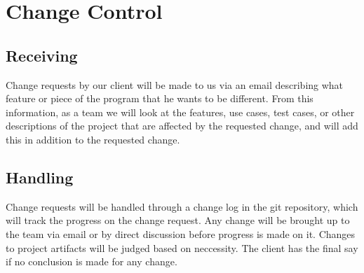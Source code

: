 \section{Change Control}
\subsection{Receiving}
Change requests by our client will be made to us via an email describing what feature or piece of the program that he wants to be different. From this information, as a team we will look at the features, use cases, test cases, or other descriptions of the project that are affected by the requested change, and will add this in addition to the requested change.
\subsection{Handling}
Change requests will be handled through a change log in the git repository, which will track the progress on the change request. Any change will be brought up to the team via email or by direct discussion before progress is made on it. Changes to project artifacts will be judged based on neccessity. The client has the final say if no conclusion is made for any change.
